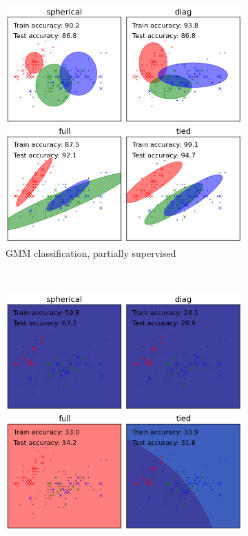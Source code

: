 \documentclass{article}
\begin{document}
    \begin{figure}
            \centering
            \begin{subfigure}[h]{0.5\textwidth}
                    \centering
                    \includegraphics[width=\textwidth]{gmm_class_orig.png}
                    \caption{GMM classification, partially supervised}
                    \label{fig:GMM_orig}
            \end{subfigure}%
            ~ %
            \begin{subfigure}[h]{0.5\textwidth}
                    \centering
                    \includegraphics[width=\textwidth]{gmm_class_DPfail.png}

\end{subfigure}
\end{figure}
\end{document}
